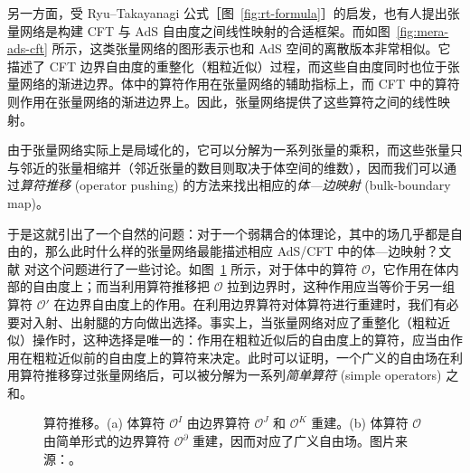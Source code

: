 另一方面，受 Ryu--Takayanagi 公式\cite{ryu2006holographic,nishioka2009holographic}［图~\ref{fig:rt-formula}］的启发，也有人提出张量网络是构建 CFT 与 AdS 自由度之间线性映射的合适框架\cite{swingle2012entanglement}。而如图~\ref{fig:mera-ads-cft} 所示，这类张量网络的图形表示也和 AdS 空间的离散版本非常相似。它描述了 CFT 边界自由度的重整化（粗粒近似）过程，而这些自由度同时也位于张量网络的渐进边界。体中的算符作用在张量网络的辅助指标上，而 CFT 中的算符则作用在张量网络的渐进边界上。因此，张量网络提供了这些算符之间的线性映射\cite{pastawski2015holographic,hayden2016holographic}。

由于张量网络实际上是局域化的，它可以分解为一系列张量的乘积，而这些张量只与邻近的张量相缩并（邻近张量的数目则取决于体空间的维数），因而我们可以通过\emph{算符推移} (operator pushing) 的方法来找出相应的\emph{体—边映射} (bulk-boundary map)\cite{pastawski2015holographic,bhattacharyya2016exploring,bhattacharyya2018tensor}。

于是这就引出了一个自然的问题：对于一个弱耦合的体理论，其中的场几乎都是自由的，那么此时什么样的张量网络最能描述相应 AdS/CFT 中的体—边映射？文献 \parencite{bhattacharyya2018tensor} 对这个问题进行了一些讨论。如图~\ref{fig:operator-pushing} 所示，对于体中的算符 $\mathcal{O}$，它作用在体内部的自由度上；而当利用算符推移把 $\mathcal{O}$ 拉到边界时，这种作用应当等价于另一组算符 $\mathcal{O}'$ 在边界自由度上的作用。在利用边界算符对体算符进行重建时，我们有必要对入射、出射腿的方向做出选择。事实上，当张量网络对应了重整化（粗粒近似）操作时，这种选择是唯一的：作用在粗粒近似后的自由度上的算符，应当由作用在粗粒近似前的自由度上的算符来决定。此时可以证明，一个广义的自由场在利用算符推移穿过张量网络后，可以被分解为一系列\emph{简单算符} (simple operators) 之和\cite{bhattacharyya2018tensor}。

\begin{figure}[htb]
  \centering
   \quad
  \caption[算符推移]{算符推移。(a) 体算符 $\mathcal{O}^I$ 由边界算符 $\mathcal{O}^J$ 和 $\mathcal{O}^K$ 重建。(b) 体算符 $\mathcal{O}$ 由简单形式的边界算符 $\mathcal{O}^\partial$ 重建，因而对应了广义自由场。图片来源：\parencite{bhattacharyya2018tensor}。}
  \label{fig:operator-pushing}
\end{figure}


